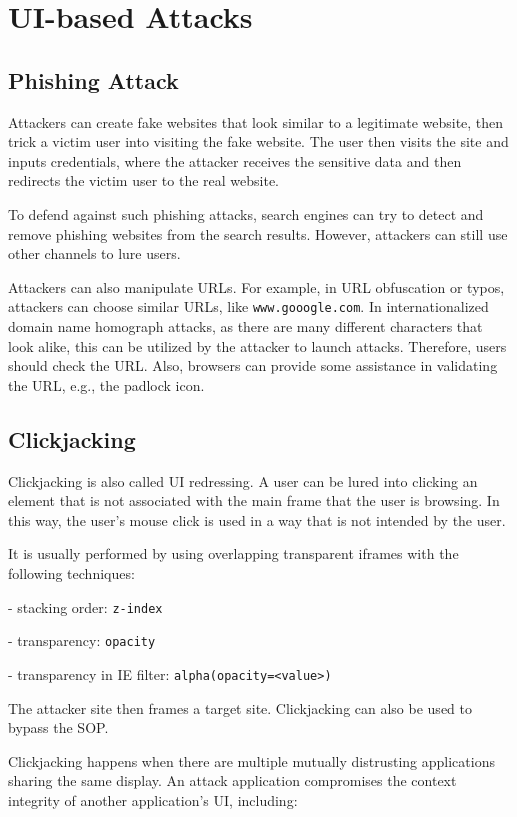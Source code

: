 \section{UI-based Attacks}
\subsection{Phishing Attack}
Attackers can create fake websites that look similar to a legitimate website, then trick a victim user into visiting the fake website. The user then visits the site and inputs credentials, where the attacker receives the sensitive data and then redirects the victim user to the real website. 

To defend against such phishing attacks, search engines can try to detect and remove phishing websites from the search results. However, attackers can still use other channels to lure users. 

Attackers can also manipulate URLs. For example, in URL obfuscation or typos, attackers can choose similar URLs, like \texttt{www.gooogle.com}. In internationalized domain name homograph attacks, as there are many different characters that look alike, this can be utilized by the attacker to launch attacks. Therefore, users should check the URL. Also, browsers can provide some assistance in validating the URL, e.g., the padlock icon. 

\subsection{Clickjacking}
Clickjacking is also called UI redressing. A user can be lured into clicking an element that is not associated with the main frame that the user is browsing. In this way, the user's mouse click is used in a way that is not intended by the user. 

It is usually performed by using overlapping transparent iframes with the following techniques:

- stacking order: \texttt{z-index}  

- transparency: \texttt{opacity}  

- transparency in IE filter: \texttt{alpha(opacity=<value>)}  

The attacker site then frames a target site. Clickjacking can also be used to bypass the SOP. 

Clickjacking happens when there are multiple mutually distrusting applications sharing the same display. An attack application compromises the context integrity of another application's UI, including:


